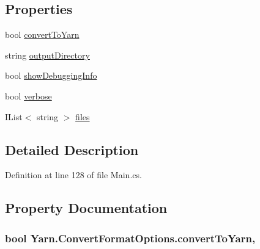 \subsection*{Properties}
\begin{DoxyCompactItemize}
\item 
bool \hyperlink{a00057_a052d6f00647c503adc5a79a1ff92cdf4}{convert\-To\-Yarn}
\item 
string \hyperlink{a00057_ab636bde93c2204b2af1a9306560d9749}{output\-Directory}
\item 
bool \hyperlink{a00042_a89964ea17bd19caf00cb5bff563ed01c}{show\-Debugging\-Info}
\item 
bool \hyperlink{a00042_ada4d83d1756918f362d55f6649b82b17}{verbose}
\item 
I\-List$<$ string $>$ \hyperlink{a00042_aa93cbb1bc1d5328e0a417012621e92d2}{files}
\end{DoxyCompactItemize}


\subsection{Detailed Description}


Definition at line 128 of file Main.\-cs.



\subsection{Property Documentation}
\hypertarget{a00057_a052d6f00647c503adc5a79a1ff92cdf4}{
\subsubsection[{convert\-To\-Yarn}]{\setlength{\rightskip}{0pt plus 5cm}bool Yarn.\-Convert\-Format\-Options.\-convert\-To\-Yarn\hspace{0.3cm}{\ttfamily [get]}, {\ttfamily [set]}}}\label{a00057_a052d6f00647c503adc5a79a1ff92cdf4}



